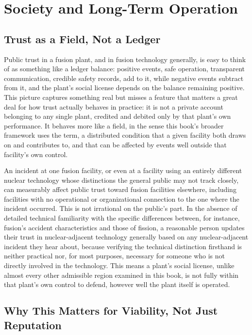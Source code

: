 \chapter{Society and Long-Term Operation}

\section{Trust as a Field, Not a Ledger}

Public trust in a fusion plant, and in fusion technology generally, is easy to think of as something like a ledger balance: positive events, safe operation, transparent communication, credible safety records, add to it, while negative events subtract from it, and the plant's social license depends on the balance remaining positive. This picture captures something real but misses a feature that matters a great deal for how trust actually behaves in practice: it is not a private account belonging to any single plant, credited and debited only by that plant's own performance. It behaves more like a field, in the sense this book's broader framework uses the term, a distributed condition that a given facility both draws on and contributes to, and that can be affected by events well outside that facility's own control.

An incident at one fusion facility, or even at a facility using an entirely different nuclear technology whose distinctions the general public may not track closely, can measurably affect public trust toward fusion facilities elsewhere, including facilities with no operational or organizational connection to the one where the incident occurred. This is not irrational on the public's part. In the absence of detailed technical familiarity with the specific differences between, for instance, fusion's accident characteristics and those of fission, a reasonable person updates their trust in nuclear-adjacent technology generally based on any nuclear-adjacent incident they hear about, because verifying the technical distinction firsthand is neither practical nor, for most purposes, necessary for someone who is not directly involved in the technology. This means a plant's social license, unlike almost every other admissible region examined in this book, is not fully within that plant's own control to defend, however well the plant itself is operated.

\section{Why This Matters for Viability, Not Just Reputation}

